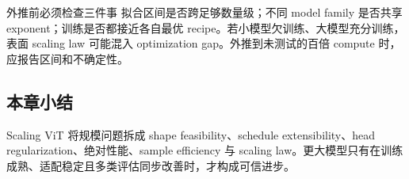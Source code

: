 \begin{warningbox}{外推前必须检查三件事}
拟合区间是否跨足够数量级；不同 model family 是否共享 exponent；训练是否都接近各自最优 recipe。若小模型欠训练、大模型充分训练，表面 scaling law 可能混入 optimization gap。外推到未测试的百倍 compute 时，应报告区间和不确定性。
\end{warningbox}

\subsection{本章小结}

Scaling ViT 将规模问题拆成 shape feasibility、schedule extensibility、head regularization、绝对性能、sample efficiency 与 scaling law。更大模型只有在训练成熟、适配稳定且多类评估同步改善时，才构成可信进步。

